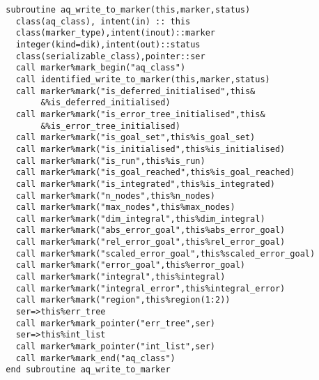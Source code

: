 \begin{Verbatim}
  subroutine aq_write_to_marker(this,marker,status)
    class(aq_class), intent(in) :: this
    class(marker_type),intent(inout)::marker
    integer(kind=dik),intent(out)::status  
    class(serializable_class),pointer::ser
    call marker%mark_begin("aq_class")
    call identified_write_to_marker(this,marker,status)
    call marker%mark("is_deferred_initialised",this&
         &%is_deferred_initialised)
    call marker%mark("is_error_tree_initialised",this&
         &%is_error_tree_initialised)
    call marker%mark("is_goal_set",this%is_goal_set)
    call marker%mark("is_initialised",this%is_initialised)
    call marker%mark("is_run",this%is_run)
    call marker%mark("is_goal_reached",this%is_goal_reached)
    call marker%mark("is_integrated",this%is_integrated)
    call marker%mark("n_nodes",this%n_nodes)
    call marker%mark("max_nodes",this%max_nodes)
    call marker%mark("dim_integral",this%dim_integral)    
    call marker%mark("abs_error_goal",this%abs_error_goal)
    call marker%mark("rel_error_goal",this%rel_error_goal)
    call marker%mark("scaled_error_goal",this%scaled_error_goal)
    call marker%mark("error_goal",this%error_goal)
    call marker%mark("integral",this%integral)
    call marker%mark("integral_error",this%integral_error)
    call marker%mark("region",this%region(1:2))
    ser=>this%err_tree
    call marker%mark_pointer("err_tree",ser)
    ser=>this%int_list
    call marker%mark_pointer("int_list",ser)
    call marker%mark_end("aq_class")
  end subroutine aq_write_to_marker
\end{Verbatim}

